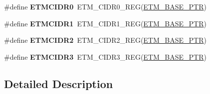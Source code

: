 \begin{DoxyCompactItemize}
\item 
\hypertarget{group___e_t_m___register___accessor___macros_ga2caeb00445e2635d6d9ff0efbdcf3672}{}\#define {\bfseries E\+T\+M\+C\+I\+D\+R0}~E\+T\+M\+\_\+\+C\+I\+D\+R0\+\_\+\+R\+E\+G(\hyperlink{group___e_t_m___peripheral_ga5f573e73b1defe379e4a2e666d2e47c7}{E\+T\+M\+\_\+\+B\+A\+S\+E\+\_\+\+P\+T\+R})\label{group___e_t_m___register___accessor___macros_ga2caeb00445e2635d6d9ff0efbdcf3672}

\item 
\hypertarget{group___e_t_m___register___accessor___macros_ga1efa6f91e4a18f6a03601fcf32115724}{}\#define {\bfseries E\+T\+M\+C\+I\+D\+R1}~E\+T\+M\+\_\+\+C\+I\+D\+R1\+\_\+\+R\+E\+G(\hyperlink{group___e_t_m___peripheral_ga5f573e73b1defe379e4a2e666d2e47c7}{E\+T\+M\+\_\+\+B\+A\+S\+E\+\_\+\+P\+T\+R})\label{group___e_t_m___register___accessor___macros_ga1efa6f91e4a18f6a03601fcf32115724}

\item 
\hypertarget{group___e_t_m___register___accessor___macros_gafcfc7ea4ce6ec9fed12bf13d190aadd9}{}\#define {\bfseries E\+T\+M\+C\+I\+D\+R2}~E\+T\+M\+\_\+\+C\+I\+D\+R2\+\_\+\+R\+E\+G(\hyperlink{group___e_t_m___peripheral_ga5f573e73b1defe379e4a2e666d2e47c7}{E\+T\+M\+\_\+\+B\+A\+S\+E\+\_\+\+P\+T\+R})\label{group___e_t_m___register___accessor___macros_gafcfc7ea4ce6ec9fed12bf13d190aadd9}

\item 
\hypertarget{group___e_t_m___register___accessor___macros_ga3dff405b56248afbe5582136e8e7a841}{}\#define {\bfseries E\+T\+M\+C\+I\+D\+R3}~E\+T\+M\+\_\+\+C\+I\+D\+R3\+\_\+\+R\+E\+G(\hyperlink{group___e_t_m___peripheral_ga5f573e73b1defe379e4a2e666d2e47c7}{E\+T\+M\+\_\+\+B\+A\+S\+E\+\_\+\+P\+T\+R})\label{group___e_t_m___register___accessor___macros_ga3dff405b56248afbe5582136e8e7a841}

\end{DoxyCompactItemize}


\subsection{Detailed Description}
